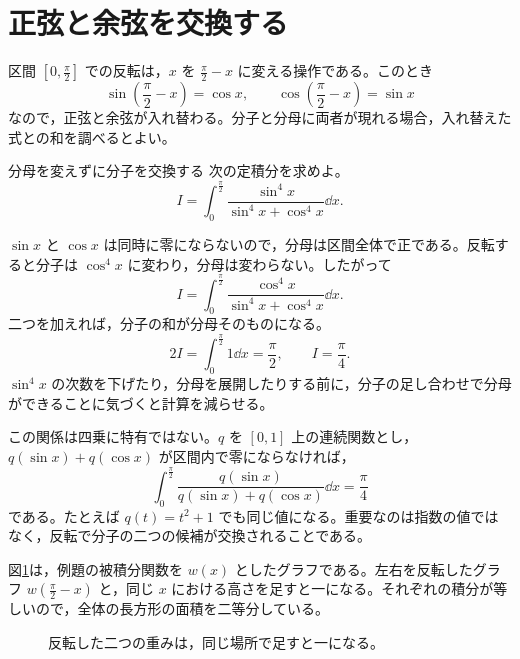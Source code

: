 \section{正弦と余弦を交換する}\label{節:正弦余弦の交換}

区間 $\left[0,\frac{\pi}{2}\right]$ での反転は，$x$ を $\frac{\pi}{2}-x$ に変える操作である。このとき
\[
\sin\left(\frac{\pi}{2}-x\right)=\cos x,\qquad
\cos\left(\frac{\pi}{2}-x\right)=\sin x
\]
なので，正弦と余弦が入れ替わる。分子と分母に両者が現れる場合，入れ替えた式との和を調べるとよい。

\begin{example}{分母を変えずに分子を交換する}
次の定積分を求めよ。
\[
I=\int_0^{\frac{\pi}{2}}
\frac{\sin^4x}{\sin^4x+\cos^4x}\dd x.
\]
\end{example}

$\sin x$ と $\cos x$ は同時に零にならないので，分母は区間全体で正である。反転すると分子は $\cos^4x$ に変わり，分母は変わらない。したがって
\[
I=\int_0^{\frac{\pi}{2}}
\frac{\cos^4x}{\sin^4x+\cos^4x}\dd x.
\]
二つを加えれば，分子の和が分母そのものになる。
\[
2I=\int_0^{\frac{\pi}{2}}1\dd x=\frac{\pi}{2},
\qquad I=\frac{\pi}{4}.
\]
$\sin^4x$ の次数を下げたり，分母を展開したりする前に，分子の足し合わせで分母ができることに気づくと計算を減らせる。

この関係は四乗に特有ではない。$q$ を $[0,1]$ 上の連続関数とし，$q(\sin x)+q(\cos x)$ が区間内で零にならなければ，
\[
\int_0^{\frac{\pi}{2}}
\frac{q(\sin x)}{q(\sin x)+q(\cos x)}\dd x
 =\frac{\pi}{4}
\]
である。たとえば $q(t)=t^2+1$ でも同じ値になる。重要なのは指数の値ではなく，反転で分子の二つの候補が交換されることである。

図\ref{図:相補重み}は，例題の被積分関数を $w(x)$ としたグラフである。左右を反転したグラフ $w(\frac{\pi}{2}-x)$ と，同じ $x$ における高さを足すと一になる。それぞれの積分が等しいので，全体の長方形の面積を二等分している。

\begin{figure}[htbp]
\centering
{}
\caption{反転した二つの重みは，同じ場所で足すと一になる。}\label{図:相補重み}
\end{figure}

